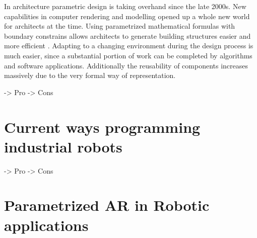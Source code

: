 In architecture parametric design is taking overhand since the late 2000s. New capabilities in computer rendering and modelling opened up a whole new world for architects at the time. Using parametrized mathematical formulas with boundary constrains allows architects to generate building structures easier and more efficient \cite{stavric2011parametric}. Adapting to a changing environment during the design process is much easier, since a substantial portion of work can be completed by algorithms and software applications. Additionally the reusability of  components increases massively due to the very formal way of representation. 


 -> Pro
 -> Cons
\section{Current ways programming industrial robots}
 -> Pro
 -> Cons
\section{Parametrized AR in Robotic applications}